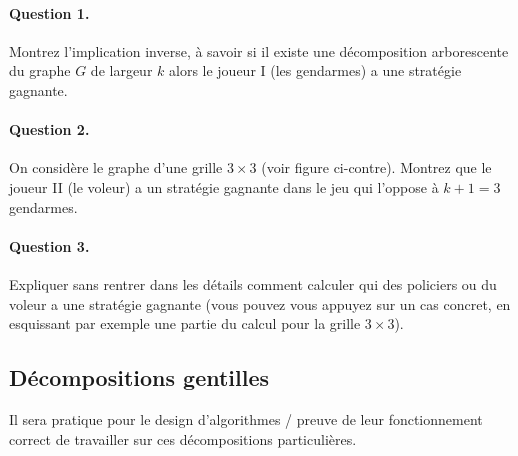 \documentclass[a4paper,12pt]{article}
\theoremstyle{definition}
\theoremstyle{remark}
\begin{document}
\paragraph{Question 1.} Montrez l'implication inverse, à savoir si il existe une décomposition
arborescente du graphe $G$ de largeur $k$ alors le joueur I (les
gendarmes) a une stratégie gagnante.
\paragraph{Question 2.} On considère le graphe d'une grille $3\times 3$ (voir figure ci-contre). Montrez que le joueur
II (le voleur) a un stratégie gagnante dans le jeu qui l'oppose à
$k+1=3$ gendarmes.
\paragraph{Question 3.} Expliquer sans rentrer dans les détails comment calculer qui des
policiers ou du voleur a une stratégie gagnante (vous pouvez vous
appuyez sur un cas concret, en esquissant par exemple une partie du calcul
pour la grille $3\times 3$). 



\subsection*{Décompositions gentilles}
Il sera pratique pour le design d'algorithmes / preuve de leur
fonctionnement correct de travailler sur ces décompositions particulières.
\end{document}
